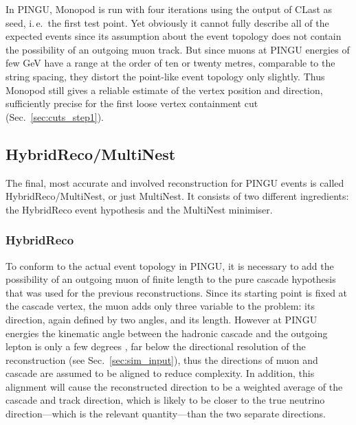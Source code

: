 In PINGU, Monopod is run with four iterations using the output of CLast as
seed, i.\,e.\ the first test point. Yet obviously it cannot fully describe
all of the expected events since its assumption about the event topology does
not contain the possibility of an outgoing muon track. But since muons at PINGU
energies of few GeV have a range at the order of ten or twenty metres,
comparable to the string spacing, they distort the point-like event topology
only slightly. Thus Monopod still gives a reliable estimate of the vertex
position and direction, sufficiently precise for the first loose vertex
containment cut (Sec.~\ref{sec:cuts_step1}).

\subsection{HybridReco/MultiNest}
\label{sec:reco_multinest}

The final, most accurate and involved reconstruction for PINGU events is called
HybridReco/MultiNest, or just MultiNest. It consists of two different
ingredients: the HybridReco event hypothesis and the MultiNest minimiser.

\subsubsection{HybridReco}

To conform to the actual event topology in PINGU, it is necessary to add the
possibility of an outgoing muon of finite length to the pure cascade hypothesis
that was used for the previous reconstructions. Since its starting point is
fixed at the cascade vertex, the muon adds only three variable to the problem:
its direction, again defined by two angles, and its length. However at PINGU
energies the kinematic angle between the hadronic cascade and the outgoing
lepton is only a few degrees \cite{NuScattAng}, far below the directional
resolution of the reconstruction (see Sec.~\ref{sec:sim_input}), thus the
directions
of muon and cascade are assumed to be aligned to reduce complexity. In addition,
this alignment will cause the reconstructed direction to be a weighted average
of the cascade and track direction, which is likely to be closer to the true
neutrino direction---which is the relevant quantity---than the two separate
directions.

